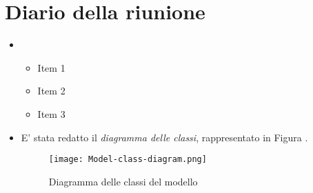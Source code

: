 

\section{Diario della riunione}

\begin{itemize}
    \item \lipsum[1]
    \begin{itemize}
        \renewcommand{\labelitemii}{--}
        \item Item 1
        \item Item 2
        \item Item 3
    \end{itemize}
    \item E' stata redatto il \emph{diagramma delle classi}, rappresentato in Figura .
    \begin{figure}[h]
      \centering
      \texttt{[image: Model-class-diagram.png]}
      \caption{Diagramma delle classi del modello}
      \label{fig:immagine}
    \end{figure}
\end{itemize}